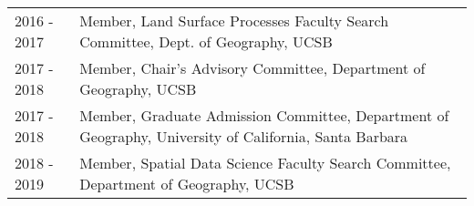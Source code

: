 
\begin{supertabular}{lp{15cm}} 
2016 - 2017 & Member, Land Surface Processes Faculty Search Committee, Dept. of Geography, UCSB \\
2017 - 2018 & Member, Chair's Advisory Committee, Department of Geography, UCSB \\
2017 - 2018 & Member, Graduate Admission Committee, Department of Geography, University of California, Santa Barbara \\
2018 - 2019 & Member, Spatial Data Science Faculty Search Committee, Department of Geography, UCSB \\
\end{supertabular}

